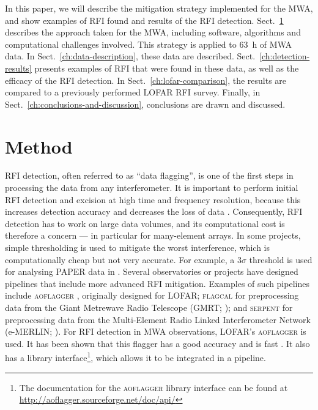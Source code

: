 \documentclass{pasa}
\begin{document}
In this paper, we will describe the mitigation strategy implemented for the MWA, and show examples of RFI found and results of the RFI detection. Sect.~\ref{ch:method} describes the approach taken for the MWA, including software, algorithms and computational challenges involved. This strategy is applied to 63~h of MWA data. In Sect.~\ref{ch:data-description}, these data are described. Sect.~\ref{ch:detection-results} presents examples of RFI that were found in these data, as well as the efficacy of the RFI detection. In Sect.~\ref{ch:lofar-comparison}, the results are compared to a previously performed LOFAR RFI survey. Finally, in Sect.~\ref{ch:conclusions-and-discussion}, conclusions are drawn and discussed.

\section{Method} \label{ch:method}
RFI detection, often referred to as ``data flagging'', is one of the first steps in processing the data from any interferometer. It is important to perform initial RFI detection and excision at high time and frequency resolution, because this increases detection accuracy and decreases the loss of data \citep{lofar-radio-environment}. Consequently, RFI detection has to work on large data volumes, and its computational cost is therefore a concern --- in particular for many-element arrays. In some projects, simple thresholding is used to mitigate the worst interference, which is computationally cheap but not very accurate. For example, a $3\sigma$ threshold is used for analysing PAPER data in \citet{parsons-paper-eorlimit-2014}. Several observatories or projects have designed pipelines that include more advanced RFI mitigation. Examples of such pipelines include \textsc{aoflagger} \citep{post-correlation-rfi-classification,scale-invariant-rank-operator}, originally designed for LOFAR; \textsc{flagcal} for preprocessing data from the Giant Metrewave Radio Telescope (GMRT; \citealt{prasad-flagcal-2012}); and \textsc{serpent} for preprocessing data from the Multi-Element Radio Linked Interferometer Network (e-MERLIN; \citealt{serpent-peck-2013}). For RFI detection in MWA observations, LOFAR's \textsc{aoflagger} is used. It has been shown that this flagger has a good accuracy and is fast \citep{lofar-radio-environment}. It also has a library interface\footnote{The documentation for the \textsc{aoflagger} library interface can be found at \url{http://aoflagger.sourceforge.net/doc/api/}}, which allows it to be integrated in a pipeline.
\end{document}

